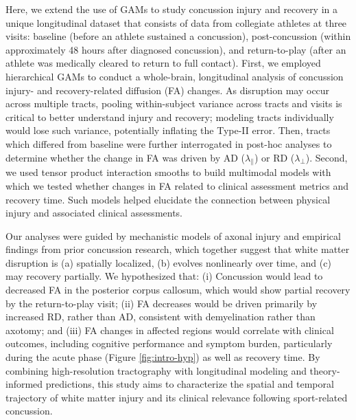 \documentclass[12pt]{article}
\begin{document}
Here, we extend the use of GAMs to study concussion injury and recovery in a unique longitudinal dataset that consists of data from collegiate athletes at three visits: baseline (before an athlete sustained a concussion), post-concussion (within approximately 48 hours after diagnosed concussion), and return-to-play (after an athlete was medically cleared to return to full contact). First, we employed hierarchical GAMs to conduct a whole-brain, longitudinal analysis of concussion injury- and recovery-related diffusion (FA) changes. As disruption may occur across multiple tracts, pooling within-subject variance across tracts and visits is critical to better understand injury and recovery; modeling tracts individually would lose such variance, potentially inflating the Type-II error. Then, tracts which differed from baseline were further interrogated in post-hoc analyses to determine whether the change in FA was driven by AD ($\lambda_\parallel$) or RD ($\lambda_\perp$). Second, we used tensor product interaction smooths to build multimodal models with which we tested whether changes in FA related to clinical assessment metrics and recovery time. Such models helped elucidate the connection between physical injury and associated clinical assessments.

Our analyses were guided by mechanistic models of axonal injury and empirical findings from prior concussion research, which together suggest that white matter disruption is (a) spatially localized, (b) evolves nonlinearly over time, and (c) may recovery partially. We hypothesized that: (i) Concussion would lead to decreased FA in the posterior corpus callosum, which would show partial recovery by the return-to-play visit; (ii) FA decreases would be driven primarily by increased RD, rather than AD, consistent with demyelination rather than axotomy; and (iii) FA changes in affected regions would correlate with clinical outcomes, including cognitive performance and symptom burden, particularly during the acute phase (Figure \ref{fig:intro-hyp}) as well as recovery time. By combining high-resolution tractography with longitudinal modeling and theory-informed predictions, this study aims to characterize the spatial and temporal trajectory of white matter injury and its clinical relevance following sport-related concussion.
\end{document}
